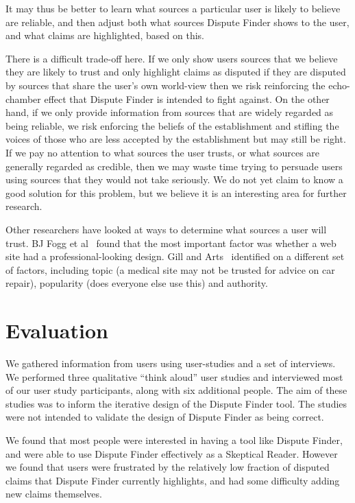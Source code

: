 \documentclass{www2010-submission}
\newcommand{\todo}[1]{}
\begin{document}
It may thus be better to learn what sources a particular user is likely to believe are reliable, and then adjust both what sources Dispute Finder shows to the user, and what claims are highlighted, based on this.

There is a difficult trade-off here. If we only show users sources that we believe they are likely to trust and only highlight claims as disputed if they are disputed by sources that share the user's own world-view then we risk reinforcing the echo-chamber effect that Dispute Finder is intended to fight against. On the other hand, if we only provide information from sources that are widely regarded as being reliable, we risk enforcing the beliefs of the establishment and stifling the voices of those who are less accepted by the establishment but may still be right. If we pay no attention to what sources the user trusts, or what sources are generally regarded as credible, then we may waste time trying to persuade users using sources that they would not take seriously. We do not yet claim to know a good solution for this problem, but we believe it is an interesting area for further research.

\todo{Cite Pew Research study saying people like to read news that supports their own point of view, but many others like neutral sources. http://people-press.org/report/?pageid=1353}

Other researchers have looked at ways to determine what sources a user will trust. 
BJ Fogg et al~\cite{Fogg2003} found that the most important factor was whether a web site had a professional-looking design. Gill and Arts~\cite{Gil2006} identified on a different set of factors, including topic (a medical site may not be trusted for advice on car repair), popularity (does everyone else use this) and authority.


\section{Evaluation}
\label{sec:interviews}
\label{user-studies}

We gathered information from users using user-studies and a set of interviews. We performed three qualitative ``think aloud'' user studies and interviewed most of our user study participants, along with six additional people. The aim of these studies was to inform the iterative design of the Dispute Finder tool. The studies were not intended to validate the design of Dispute Finder as being correct. 

We found that most people were interested in having a tool like Dispute Finder, and were able to use Dispute Finder effectively as a Skeptical Reader. However we found that users were frustrated by the relatively low fraction of disputed claims that Dispute Finder currently highlights, and had some difficulty adding new claims themselves.
\end{document}
